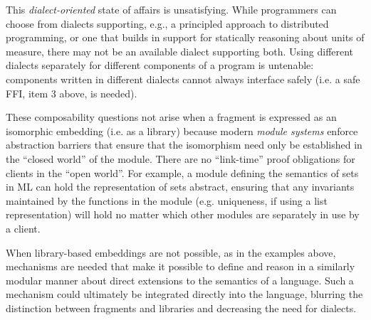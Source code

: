 \documentclass[10pt,preprint]{sigplanconf}
\begin{document}
This \emph{dialect-oriented} state of affairs is unsatisfying. %
While programmers can choose from dialects supporting, e.g., a principled approach to distributed programming, or one that builds in support for statically reasoning about units of measure, there may not be an available dialect supporting both. Using different dialects separately for different components of a program is untenable: components written in different dialects cannot always interface safely (i.e. a safe FFI, item 3 above, is needed). 

These composability questions not arise when a fragment is expressed as an isomorphic embedding (i.e. as a library) because modern \emph{module systems} enforce abstraction barriers that ensure that the isomorphism need only be established in the ``closed world'' of the module. There are no ``link-time'' proof obligations for clients in the ``open world''. For example, a module defining the semantics of sets in ML can hold the representation of sets abstract, ensuring that any invariants maintained by the functions in the module (e.g. uniqueness, if using a list representation) will hold no matter which other modules are separately in use by a client. %

When library-based embeddings are not possible, as in the examples above, mechanisms are needed that make it possible to define and  reason in a similarly modular manner about  direct extensions to the semantics of a language. Such a mechanism could ultimately be integrated directly into the language, blurring the distinction between fragments and libraries and decreasing the need for dialects.%
\end{document}
